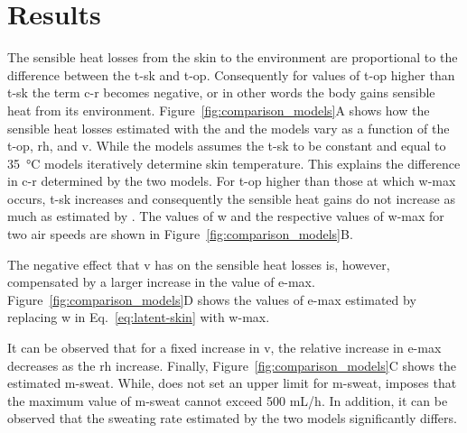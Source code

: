 

\section{Results}\label{sec:results}

The sensible heat losses from the skin to the environment are proportional to the difference between the \ac{t-sk} and \ac{t-op}.
Consequently for values of \ac{t-op} higher than \ac{t-sk} the term \ac{c-r} becomes negative, or in other words the body gains sensible heat from its environment.
Figure~\ref{fig:comparison_models}A shows how the sensible heat losses estimated with the  and the  models vary as a function of the \ac{t-op}, \ac{rh}, and \ac{v}.
While the  models assumes the \ac{t-sk} to be constant and equal to 35~°C  models iteratively determine skin temperature.
This explains the difference in \ac{c-r} determined by the two models.
For \ac{t-op} higher than those at which \ac{w-max} occurs, \ac{t-sk} increases and consequently the sensible heat gains do not increase as much as estimated by .
The values of \ac{w} and the respective values of \ac{w-max} for two air speeds are shown in Figure~\ref{fig:comparison_models}B.

The negative effect that \ac{v} has on the sensible heat losses is, however, compensated by a larger increase in the value of \ac{e-max}.
Figure~\ref{fig:comparison_models}D shows the values of \ac{e-max} estimated by replacing \ac{w} in Eq.~\ref{eq:latent-skin} with \ac{w-max}.

It can be observed that for a fixed increase in \ac{v}, the relative increase in \ac{e-max} decreases as the \ac{rh} increase.
Finally, Figure~\ref{fig:comparison_models}C shows the estimated \ac{m-sweat}.
While,  does not set an upper limit for \ac{m-sweat},  imposes that the maximum value of \ac{m-sweat} cannot exceed 500 mL/h. %
In addition, it can be observed that the sweating rate estimated by the two models significantly differs.

